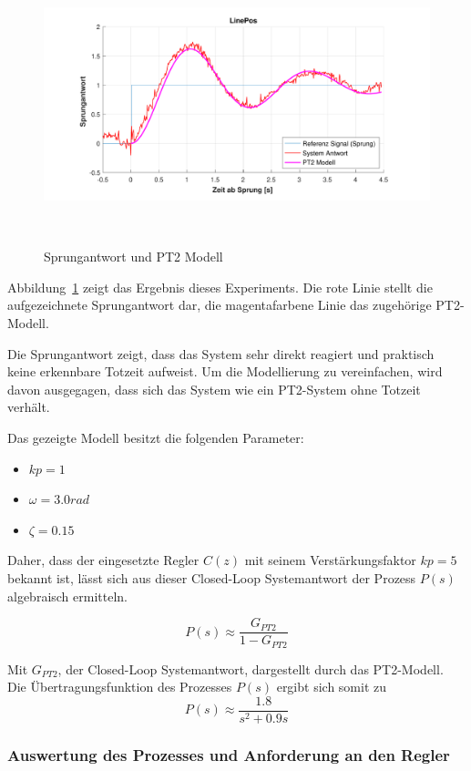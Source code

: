 \documentclass[main.tex]{subfiles} %
\begin{document}
\begin{figure}[H]
    \centering
    \includegraphics[width=1\linewidth]{fig_Parametrierung_Linienfolgeregler/Sprungantwort_System.pdf}
    \caption{Sprungantwort und PT2 Modell}~\label{fig:Sprungantwort}
\end{figure}

Abbildung~\ref{fig:Sprungantwort} zeigt das Ergebnis dieses Experiments. Die
rote Linie stellt die aufgezeichnete Sprungantwort dar, die magentafarbene
Linie das zugehörige PT2-Modell.

Die Sprungantwort zeigt, dass das System sehr direkt reagiert und praktisch
keine erkennbare Totzeit aufweist. Um die Modellierung zu vereinfachen, wird
davon ausgegagen, dass sich das System wie ein PT2-System ohne Totzeit verhält.

Das gezeigte Modell besitzt die folgenden Parameter:

\begin{itemize}
    \item $kp = 1$
    \item $\omega = 3.0 rad$
    \item $\zeta = 0.15$
\end{itemize}

Daher, dass der eingesetzte Regler $C(z)$ mit seinem Verstärkungsfaktor $kp =
    5$ bekannt ist, lässt sich aus dieser Closed-Loop Systemantwort der Prozess
$P(s)$ algebraisch ermitteln.

\[
    P(s) \approx \frac{G_{PT2}}{1 - G_{PT2}}
\]

Mit $G_{PT2}$, der Closed-Loop Systemantwort, dargestellt durch das PT2-Modell.
Die Übertragungsfunktion des Prozesses $P(s)$ ergibt sich somit zu
\[
    P(s) \approx \frac{1.8}{s^2 + 0.9s}
\]

\subsubsection*{Auswertung des Prozesses und Anforderung an den Regler}
\end{document}

